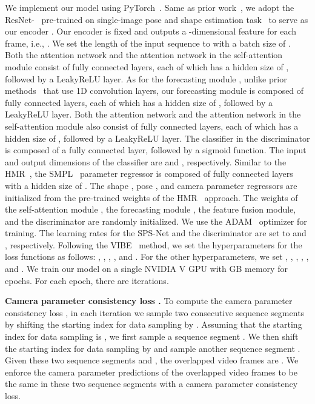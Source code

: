 \documentclass[times,referee,twocolumn,final,authoryear]{elsarticle}
\newcommand{\heading}[1]{\noindent\textbf{#1}}
\begin{document}
We implement our model using PyTorch~\citep{paszke2019pytorch}.
Same as prior work~\citep{HMR,VIBE}, we adopt the ResNet-~\citep{ResNet} pre-trained on single-image pose and shape estimation task~\citep{HMR,SPIN} to serve as our encoder .
Our encoder  is fixed and outputs a -dimensional feature for each frame, i.e., .
We set the length of the input sequence to  with a batch size of .
Both the attention network  and the attention network  in the self-attention module  consist of  fully connected layers, each of which has a hidden size of , followed by a LeakyReLU layer.
As for the forecasting module , unlike prior methods~\citep{PHD,TemporalHMR} that use 1D convolution layers, our forecasting module  is composed of  fully connected layers, each of which has a hidden size of , followed by a LeakyReLU layer.
Both the attention network  and the attention network  in the self-attention module  also consist of  fully connected layers, each of which has a hidden size of , followed by a LeakyReLU layer.
The classifier  in the discriminator  is composed of a fully connected layer, followed by a sigmoid function.
The input and output dimensions of the classifier  are  and , respectively.
Similar to the HMR~\citep{HMR}, the SMPL~\citep{SMPL} parameter regressor  is composed of  fully connected layers with a hidden size of .
The shape , pose , and camera  parameter regressors are initialized from the pre-trained weights of the HMR~\citep{HMR} approach.
The weights of the self-attention module , the forecasting module , the feature fusion module, and the discriminator  are randomly initialized.
We use the ADAM~\citep{kingma2014adam} optimizer for training.
The learning rates for the SPS-Net and the discriminator  are set to  and , respectively.
Following the VIBE~\citep{VIBE} method, we set the hyperparameters for the loss functions as follows: , , , , and .
For the other hyperparameters, we set , , , , , and .
We train our model on a single NVIDIA V GPU with GB memory for  epochs.
For each epoch, there are  iterations.

\heading{Camera parameter consistency loss .} 
To compute the camera parameter consistency loss , in each iteration we sample two consecutive sequence segments by shifting the starting index for data sampling by .
Assuming that the starting index for data sampling is , we first sample a sequence segment .
We then shift the starting index for data sampling by  and sample another sequence segment .
Given these two sequence segments  and , the overlapped video frames are .
We enforce the camera parameter predictions of the overlapped video frames  to be the same in these two sequence segments with a camera parameter consistency loss.
\end{document}

